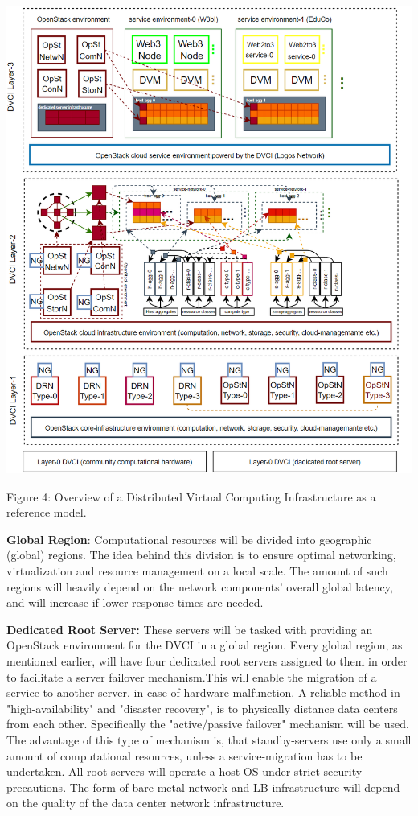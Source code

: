 \documentclass[]{article}
\begin{document}
\begin{center}
	\includegraphics[height=15.4cm]{dvci-layers}
\end{center}
\begin{center}
	Figure 4: Overview of a Distributed Virtual Computing Infrastructure as a reference model.
\end{center}

\textbf{Global Region}: 
Computational resources will be divided into geographic (global) regions.
The idea behind this division is to ensure optimal networking, virtualization and resource management on a local scale.
The amount of such regions will heavily depend on the network components' overall global latency, and will increase if lower response times are needed.
\newline

\textbf{Dedicated Root Server:}
These servers will be tasked with providing an OpenStack environment for the DVCI in a global region.
Every global region, as mentioned earlier, will have four dedicated root servers assigned to them in order to facilitate a server failover mechanism.This will enable the migration of a service to another server, in case of hardware malfunction.
A reliable method in "high-availability" and "disaster recovery", is to physically distance data centers from each other. 
Specifically the "active/passive failover" mechanism will be used.
The advantage of this type of mechanism is, that standby-servers use only a small amount of computational resources, unless a service-migration has to be undertaken. 
All root servers will operate a host-OS under strict security precautions. 
The form of bare-metal network and LB-infrastructure will depend on the quality of the data center network infrastructure.
\newline
\end{document}
